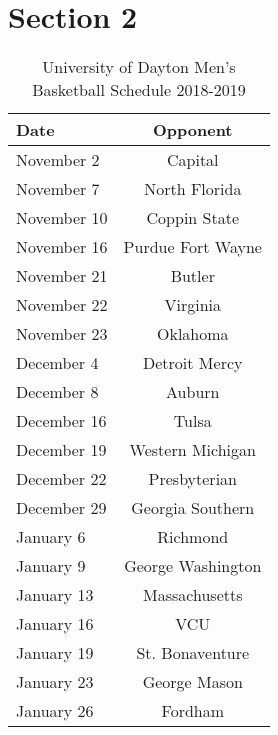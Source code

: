 \section{Section 2}

\begin{table}
    \begin{center}
        \caption{University of Dayton Men's Basketball Schedule 2018-2019}
        \label{tab:class}
        \begin{tabular}{||l|c||}
            \hline
            Date & Opponent \\
            \hline \hline
            November 2 & Capital \\
            \hline
            November 7 & North Florida \\
            \hline
            November 10 & Coppin State \\
            \hline
            November 16 & Purdue Fort Wayne \\
            \hline
            November 21 & Butler \\
            \hline
            November 22 & Virginia \\
            \hline 
            November 23 & Oklahoma \\
            \hline \hline
            December 4 & Detroit Mercy \\
            \hline
            December 8 & Auburn \\
            \hline
            December 16 & Tulsa \\
            \hline 
            December 19 & Western Michigan \\
            \hline
            December 22 & Presbyterian \\
            \hline 
            December 29 & Georgia Southern \\
            \hline \hline
            January 6 & Richmond \\
            \hline
            January 9 & George Washington \\
            \hline
            January 13 & Massachusetts \\
            \hline
            January 16 & VCU \\
            \hline
            January 19 & St. Bonaventure \\
            \hline
            January 23 & George Mason \\
            \hline
            January 26 & Fordham \\

\end{tabular}
\end{center}
\end{table}
